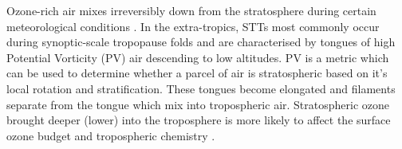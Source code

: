 Ozone-rich air mixes irreversibly down from the stratosphere during certain meteorological conditions \citep{Sprenger2003,Mihalikova2012}.
In the extra-tropics, STTs most commonly occur during synoptic-scale tropopause folds \citep{Sprenger2003} and are characterised by tongues of high Potential Vorticity (PV) air descending to low altitudes.
PV is a metric which can be used to determine whether a parcel of air is stratospheric based on it's local rotation and stratification.
These tongues become elongated and filaments separate from the tongue which mix into tropospheric air.
Stratospheric ozone brought deeper (lower) into the troposphere is more likely to affect the surface ozone budget and tropospheric chemistry \citep{Zanis2003,Langford_2009}.

  